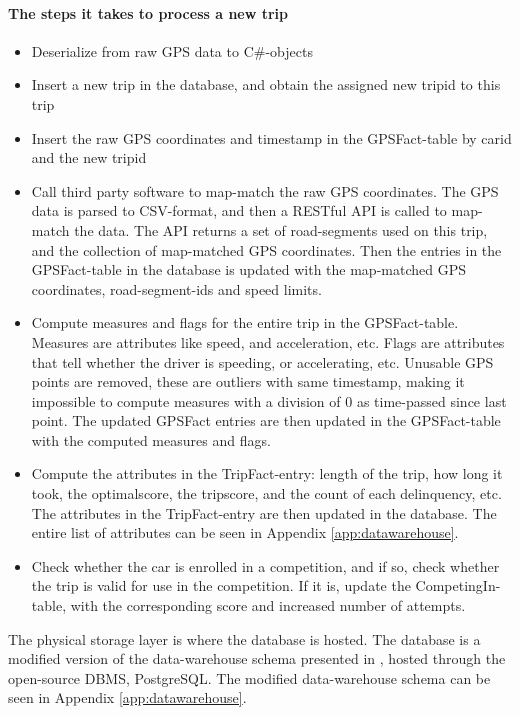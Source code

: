 \paragraph{The steps it takes to process a new trip}
\begin{itemize}
\item Deserialize from raw GPS data to C\#-objects
\item Insert a new trip in the database, and obtain the assigned new tripid to this trip
\item Insert the raw GPS coordinates and timestamp in the GPSFact-table by carid and the new tripid
\item Call third party software to map-match the raw GPS coordinates\cite{trackmatch}. The GPS data is parsed to CSV-format, and then a RESTful API is called to map-match the data. The API returns a set of road-segments used on this trip, and the collection of map-matched GPS coordinates. Then the entries in the GPSFact-table in the database is updated with the map-matched GPS coordinates, road-segment-ids and speed limits.
\item Compute measures and flags for the entire trip in the GPSFact-table. Measures are attributes like speed, and acceleration, etc. Flags are attributes that tell whether the driver is speeding, or accelerating, etc. Unusable GPS points are removed, these are outliers with same timestamp, making it impossible to compute measures with a division of 0 as time-passed since last point. The updated GPSFact entries are then updated in the GPSFact-table with the computed measures and flags.
\item Compute the attributes in the TripFact-entry: length of the trip, how long it took, the optimalscore, the tripscore, and the count of each delinquency, etc. The attributes in the TripFact-entry are then updated in the database. The entire list of attributes can be seen in Appendix \ref{app:datawarehouse}.
\item Check whether the car is enrolled in a competition, and if so, check whether the trip is valid for use in the competition. If it is, update the CompetingIn-table, with the corresponding score and increased number of attempts. 
\end{itemize}

The physical storage layer is where the database is hosted. The database is a modified version of the data-warehouse schema presented in \cite{sw9_report}, hosted through the open-source DBMS, PostgreSQL\cite{postgresql}. The modified data-warehouse schema can be seen in Appendix \ref{app:datawarehouse}.